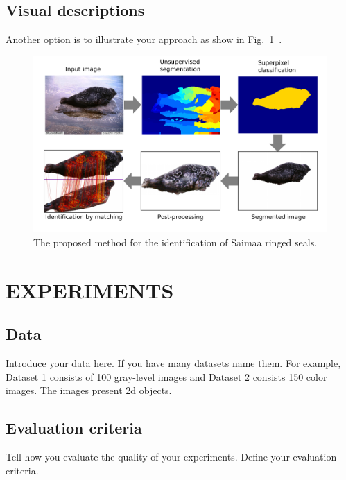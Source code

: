 \documentclass{lutmscthesis}[2017/10/03]
\begin{document}
\subsection{Visual descriptions}

Another option is to illustrate your approach as show in Fig.~\ref{fig:framework}~\cite{norppa2017}.

\begin{figure}[ht]
\begin{center}
\includegraphics[width=\textwidth]{resources/framework.pdf}
\caption{The proposed method for the identification of Saimaa ringed seals.~\cite{norppa2017}} \label{fig:framework}
\end{center}
\end{figure}

\section{EXPERIMENTS}
\label{sec:experiments}

\subsection{Data}

Introduce your data here. If you have many datasets name them. For example, Dataset 1 consists of 100 gray-level images and Dataset 2 consists 150 color images. The images present \gls{2d} objects.  

\subsection{Evaluation criteria}

Tell how you evaluate the quality of your experiments. Define your evaluation criteria. 
\end{document}
